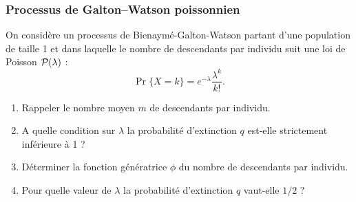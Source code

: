 \subsubsection{Processus de Galton–Watson poissonnien} %
  On considère un processus de Bienaymé-Galton-Watson partant d'une population de taille 1 et dans laquelle le nombre de descendants par individu suit une loi de Poisson $\mathcal{P}(\lambda)$ :
  $$
  \Pr\{X = k\} = e^{-\lambda} \frac{\lambda^k}{k!}.
  $$
  \begin{enumerate}
    \item Rappeler le nombre moyen $m$ de descendants par individu.
    \item A quelle condition sur $\lambda$ la probabilité d'extinction $q$ est-elle strictement inférieure à 1 ?
    \item Déterminer la fonction génératrice $\phi$ du nombre de descendants par individu.
    \item Pour quelle valeur de $\lambda$ la probabilité d'extinction $q$ vaut-elle $1/2$ ?
  \end{enumerate}
